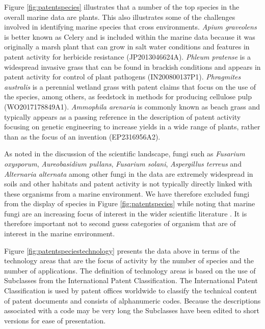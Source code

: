 \documentclass[openany]{book}
\theoremstyle{definition}
\theoremstyle{definition}
\theoremstyle{definition}
\theoremstyle{remark}
\begin{document}
Figure \ref{fig:patentspecies} illustrates that a number of the top
species in the overall marine data are plants. This also illustrates
some of the challenges involved in identifying marine species that cross
environments. \emph{Apium graveolens} is better known as Celery and is
included within the marine data because it was originally a marsh plant
that can grow in salt water conditions and features in patent activity
for herbicide resistance (JP2013046624A). \emph{Phleum pratense} is a
widespread invasive grass that can be found in brackish conditions and
appears in patent activity for control of plant pathogens
(IN200800137P1). \emph{Phragmites australis} is a perennial wetland
grass with patent claims that focus on the use of the species, among
others, as feedstock in methods for producing cellulose pulp
(WO2017178849A1). \emph{Ammophila arenaria} is commonly known as beach
grass and typically appears as a passing reference in the description of
patent activity focusing on genetic engineering to increase yields in a
wide range of plants, rather than as the focus of an invention
(EP2316956A2).

As noted in the discussion of the scientific landscape, fungi such as
\emph{Fusarium oxysporum}, \emph{Aureobasidium pullans}, \emph{Fusarium
solani}, \emph{Aspergillus terreus} and \emph{Alternaria alternata}
among other fungi in the data are extremely widespread in soils and
other habitats and patent activity is not typically directly linked with
these organisms from a marine environment. We have therefore excluded
fungi from the display of species in Figure \ref{fig:patentspecies}
while noting that marine fungi are an increasing focus of interest in
the wider scientific literature \citep[see for example,][]{Kim_2012}. It
is therefore important not to second guess categories of organism that
are of interest in the marine environment.

Figure \ref{fig:patentspeciestechnology} presents the data above in
terms of the technology areas that are the focus of activity by the
number of species and the number of applications. The definition of
technology areas is based on the use of Subclasses from the
International Patent Classification. The International Patent
Classification is used by patent offices worldwide to classify the
technical content of patent documents and consists of alphanumeric
codes. Because the descriptions associated with a code may be very long
the Subclasses have been edited to short versions for ease of
presentation.
\end{document}
